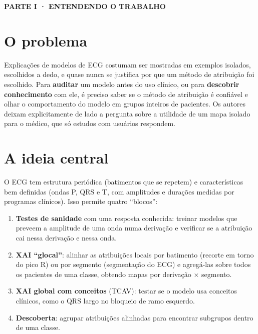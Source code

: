 \documentclass[11pt,a4paper]{article}
\newcommand{\partbar}[1]{\par\vspace{1.2em}\noindent\colorbox{black!80}{\parbox{\dimexpr\linewidth-2\fboxsep}{\color{white}\bfseries\sffamily\MakeUppercase{#1}}}\par\vspace{0.4em}}
\begin{document}
\partbar{Parte I · Entendendo o trabalho}

\section{O problema}
Explicações de modelos de ECG costumam ser mostradas em exemplos isolados, escolhidos a dedo, e quase nunca se justifica por que um método de atribuição foi escolhido. Para \textbf{auditar} um modelo antes do uso clínico, ou para \textbf{descobrir conhecimento} com ele, é preciso saber se o método de atribuição é confiável e olhar o comportamento do modelo em grupos inteiros de pacientes. Os autores deixam explicitamente de lado a pergunta sobre a utilidade de um mapa isolado para o médico, que só estudos com usuários respondem.

\section{A ideia central}
O ECG tem estrutura periódica (batimentos que se repetem) e características bem definidas (ondas P, QRS e T, com amplitudes e durações medidas por programas clínicos). Isso permite quatro “blocos”:
\begin{enumerate}
\item \textbf{Testes de sanidade} com uma resposta conhecida: treinar modelos que preveem a amplitude de uma onda numa derivação e verificar se a atribuição cai nessa derivação e nessa onda.
\item \textbf{XAI “glocal”}: alinhar as atribuições locais por batimento (recorte em torno do pico R) ou por segmento (segmentação do ECG) e agregá-las sobre todos os pacientes de uma classe, obtendo mapas por derivação × segmento.
\item \textbf{XAI global com conceitos} (TCAV): testar se o modelo usa conceitos clínicos, como o QRS largo no bloqueio de ramo esquerdo.
\item \textbf{Descoberta}: agrupar atribuições alinhadas para encontrar subgrupos dentro de uma classe.
\end{enumerate}
\end{document}
